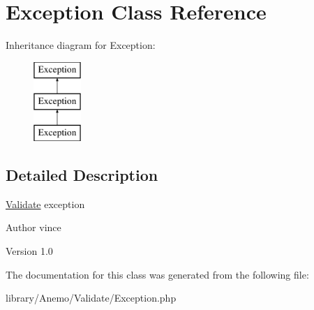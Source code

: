 \hypertarget{class_anemo_1_1_validate_1_1_exception}{
\section{Exception Class Reference}
\label{class_anemo_1_1_validate_1_1_exception}
}
Inheritance diagram for Exception:\begin{figure}[H]
\begin{center}
\leavevmode
\includegraphics[height=3.000000cm]{class_anemo_1_1_validate_1_1_exception}
\end{center}
\end{figure}


\subsection{Detailed Description}
\hyperlink{class_anemo_1_1_validate}{Validate} exception \begin{DoxyAuthor}{Author}
vince 
\end{DoxyAuthor}
\begin{DoxyVersion}{Version}
1.0 
\end{DoxyVersion}


The documentation for this class was generated from the following file:\begin{DoxyCompactItemize}
\item 
library/Anemo/Validate/Exception.php\end{DoxyCompactItemize}
